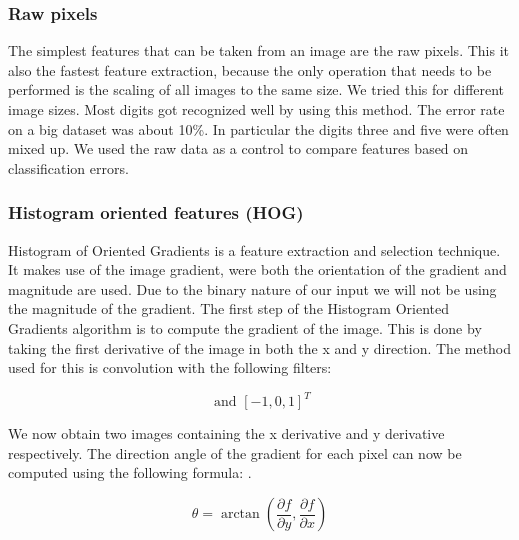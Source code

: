 \documentclass[%
        compressed,
        final,
        notitlepage,
        narroweqnarray,
        inline,
        twoside,
        ]{ieee}
\begin{document}
    \subsubsection{Raw pixels}
The simplest features that can be taken from an image are the raw pixels. This
it also the fastest feature extraction, because the only operation that needs
to be performed is the scaling of all images to the same size. We tried this for
different image sizes. Most digits got recognized well by using this method. The
error rate on a big dataset was about 10\%. In particular the digits three and five were often mixed up. We used the raw data as a control to compare features based on classification errors. 

\subsubsection{Histogram oriented features (HOG)}
Histogram of Oriented Gradients is a feature extraction and selection technique.
\cite{hog} It makes use of the image gradient, were both the orientation of the gradient and magnitude are used. Due to the binary nature of our input we will not be using the magnitude of the gradient. The first step of the Histogram Oriented Gradients algorithm is to compute the gradient of the image. This is done by taking the first derivative of the image in both the x and y direction. The method used for this is convolution with the following filters:

\begin{equation}
    [-1, 0, 1] \text{ and } [-1, 0, 1]^T
\end{equation}

We now obtain two images containing the x derivative and y derivative respectively. The direction angle of the gradient for each pixel can now be computed using the following formula: .

\begin{equation}
    \theta = \arctan\left(\frac{\partial f}{\partial y}, 
        \frac{\partial f}{\partial x}\right)
\end{equation}
\end{document}

